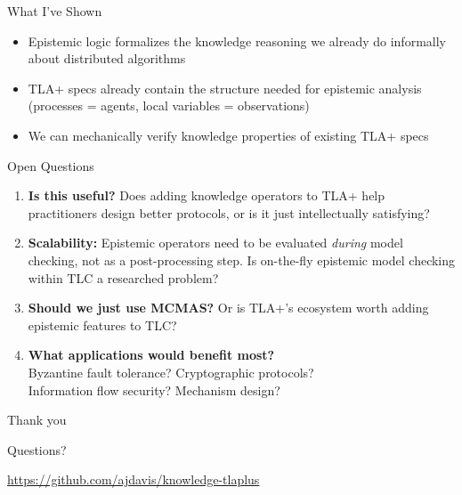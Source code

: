 \documentclass[aspectratio=169,12pt]{beamer}
\begin{document}

\begin{frame}{What I've Shown}
\begin{itemize}
\item Epistemic logic formalizes the knowledge reasoning we already do informally about distributed algorithms
\item TLA+ specs already contain the structure needed for epistemic analysis\\
(processes = agents, local variables = observations)
\item We can mechanically verify knowledge properties of existing TLA+ specs
\end{itemize}
\end{frame}

\begin{frame}{Open Questions}
\begin{enumerate}
\item \textbf{Is this useful?} Does adding knowledge operators to TLA+ help practitioners design better protocols, or is it just intellectually satisfying?

\vspace{0.3em}
\item \textbf{Scalability:} Epistemic operators need to be evaluated \emph{during} model checking, not as a post-processing step. Is on-the-fly epistemic model checking within TLC a researched problem?

\vspace{0.3em}
\item \textbf{Should we just use MCMAS?} Or is TLA+'s ecosystem worth adding epistemic features to TLC?

\vspace{0.3em}
\item \textbf{What applications would benefit most?}\\
Byzantine fault tolerance? Cryptographic protocols?\\
Information flow security? Mechanism design?
\end{enumerate}
\end{frame}

\begin{frame}{}
\begin{center}
\Huge Thank you

\vspace{1em}
\large Questions?

\vspace{2em}
\normalsize
\url{https://github.com/ajdavis/knowledge-tlaplus}
\end{center}
\end{frame}
\end{document}
